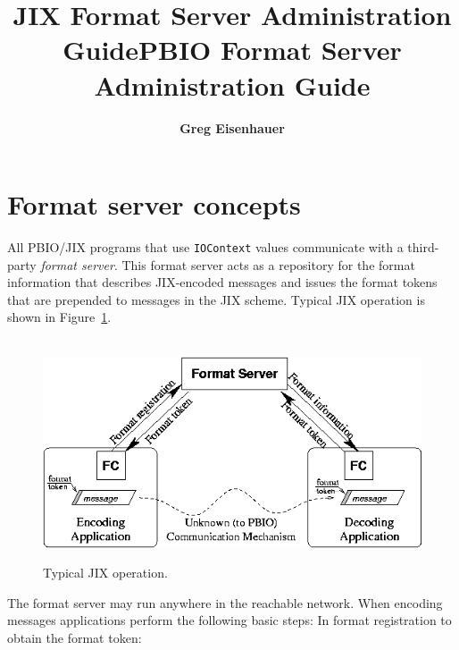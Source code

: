 \documentclass{article}
\title{JIX Format Server Administration Guide}
\author{ {\large\bf Greg Eisenhauer }\\
}
\begin{document}

\title{PBIO Format Server Administration Guide}
\renewcommand{\thepage}{}
\maketitle
\section{Format server concepts}
All PBIO/JIX programs that use {\tt IOContext} values communicate with a
third-party {\it format server}.  This format server acts as a repository
for the format information that describes JIX-encoded messages and issues
the format tokens that are prepended to messages in the JIX scheme.  Typical
JIX operation is shown in Figure~\ref{fig:server}.
\begin{figure}[tb]
\begin{center}\
\includegraphics[width=6.3in]{server.png}
\caption{Typical JIX operation.\label{fig:server}}
\end{center}
\end{figure}
The format server may run anywhere in the reachable network.  When encoding
messages applications perform the following basic steps:
In format registration to obtain the format token:
\end{document}
